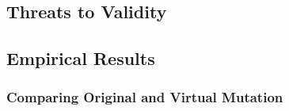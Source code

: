 \subsection{Threats to Validity}

\subsection{Empirical Results}




\subsubsection{Comparing Original and Virtual Mutation}
\label{sec:empirical-study-RQ-original-virtual-time}


